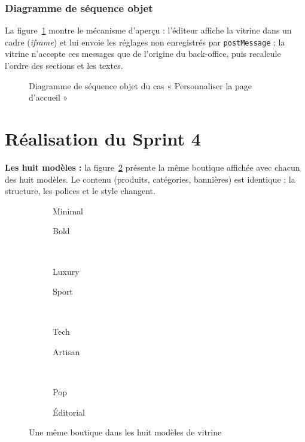 \subsubsection{Diagramme de séquence objet}
La figure~\ref{fig:dso-theme} montre le mécanisme d'aperçu : l'éditeur affiche la vitrine dans un cadre (\textit{iframe}) et lui envoie les réglages non enregistrés par \texttt{postMessage} ; la vitrine n'accepte ces messages que de l'origine du back-office, puis recalcule l'ordre des sections et les textes.
\begin{figure}[H]
    \centering
    \caption{Diagramme de séquence objet du cas « Personnaliser la page d'accueil »}
    \label{fig:dso-theme}
\end{figure}

\section{Réalisation du Sprint 4}
\textbf{Les huit modèles :} la figure~\ref{fig:ui-modeles} présente la même boutique affichée avec chacun des huit modèles. Le contenu (produits, catégories, bannières) est identique ; la structure, les polices et le style changent.
\begin{figure}[H]
    \centering
    \begin{subfigure}{0.48\textwidth}\centering{}\caption{Minimal}\end{subfigure}\hfill
    \begin{subfigure}{0.48\textwidth}\centering{}\caption{Bold}\end{subfigure}\\[4pt]
    \begin{subfigure}{0.48\textwidth}\centering{}\caption{Luxury}\end{subfigure}\hfill
    \begin{subfigure}{0.48\textwidth}\centering{}\caption{Sport}\end{subfigure}\\[4pt]
    \begin{subfigure}{0.48\textwidth}\centering{}\caption{Tech}\end{subfigure}\hfill
    \begin{subfigure}{0.48\textwidth}\centering{}\caption{Artisan}\end{subfigure}\\[4pt]
    \begin{subfigure}{0.48\textwidth}\centering{}\caption{Pop}\end{subfigure}\hfill
    \begin{subfigure}{0.48\textwidth}\centering{}\caption{Éditorial}\end{subfigure}
    \caption{Une même boutique dans les huit modèles de vitrine}
    \label{fig:ui-modeles}
\end{figure}

